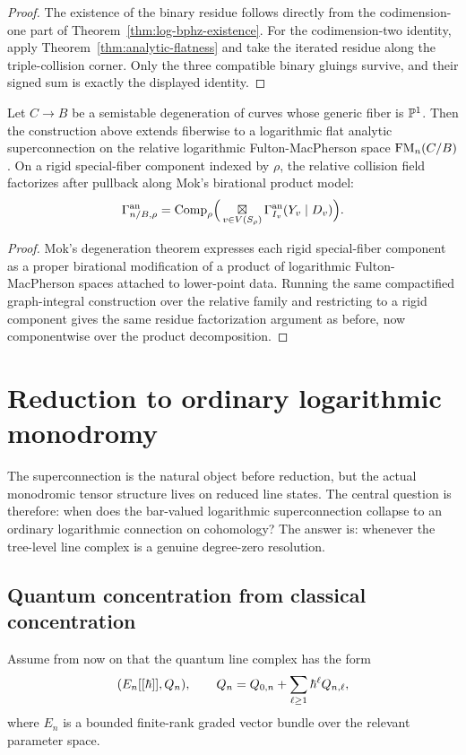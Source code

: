 \begin{proof}
The existence of the binary residue follows directly from the codimension-one part of Theorem~\ref{thm:log-bphz-existence}. For the codimension-two identity, apply Theorem~\ref{thm:analytic-flatness} and take the iterated residue along the triple-collision corner. Only the three compatible binary gluings survive, and their signed sum is exactly the displayed identity.
\end{proof}

\begin{theorem}%
Let $C\to B$ be a semistable degeneration of curves whose generic fiber is $\mathbb P^1$. Then the construction above extends fiberwise to a logarithmic flat analytic superconnection on the relative logarithmic Fulton-MacPherson space $\mathrm{FM}_n(C/B)$. On a rigid special-fiber component indexed by $\rho$, the relative collision field factorizes after pullback along Mok's birational product model:
\[
 \Gamma_{n/B,\rho}^{\mathrm{an}}
 =
 \mathrm{Comp}_\rho\Big(
 \mathop{\boxtimes}\displaylimits_{v\in V(S_\rho)} \Gamma_{I_v}^{\mathrm{an}}(Y_v\mid D_v)
 \Big).
\]
\end{theorem}

\begin{proof}
Mok's degeneration theorem expresses each rigid special-fiber component as a proper birational modification of a product of logarithmic Fulton-MacPherson spaces attached to lower-point data. Running the same compactified graph-integral construction over the relative family and restricting to a rigid component gives the same residue factorization argument as before, now componentwise over the product decomposition.
\end{proof}

\section{Reduction to ordinary logarithmic monodromy}%

The superconnection is the natural object before reduction, but the actual monodromic tensor structure lives on reduced line states. The central question is therefore: when does the bar-valued logarithmic superconnection collapse to an ordinary logarithmic connection on cohomology? The answer is: whenever the tree-level line complex is a genuine degree-zero resolution.

\subsection{Quantum concentration from classical concentration}
Assume from now on that the quantum line complex has the form
\[
 (E_n[[\hbar]],Q_n),
 \qquad
 Q_n=Q_{0,n}+\sum_{\ell\ge 1}\hbar^\ell Q_{n,\ell},
\]
where $E_n$ is a bounded finite-rank graded vector bundle over the relevant parameter space.

